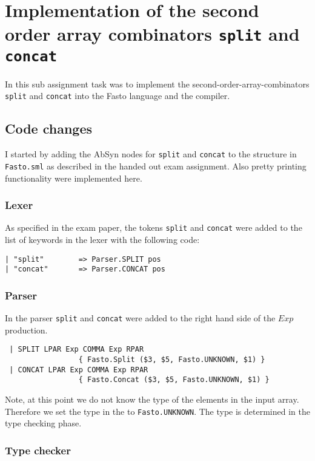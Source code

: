 \documentclass[11pt,a4paper]{article}
\begin{document}
\section{Implementation of the second order array combinators \texttt{split}
and \texttt{concat}}
In this sub assignment task was to implement the second-order-array-combinators \texttt{split}
and \texttt{concat} into the Fasto language and the compiler.

\subsection{Code changes}
I started by adding the AbSyn nodes for \texttt{split} and \texttt{concat}
to the structure in \texttt{Fasto.sml} as described in the handed out exam
assignment. Also pretty printing functionality were implemented here.

\subsubsection{Lexer}
As specified in the exam paper, the tokens \texttt{split} and \texttt{concat}
were added to the list of keywords in the lexer with the following code:
\begin{lstlisting}
| "split"        => Parser.SPLIT pos
| "concat"       => Parser.CONCAT pos
\end{lstlisting}

\subsubsection{Parser}
In the parser \texttt{split} and \texttt{concat} were added to the right hand
side of the $Exp$ production.
\begin{lstlisting}
 | SPLIT LPAR Exp COMMA Exp RPAR
                 { Fasto.Split ($3, $5, Fasto.UNKNOWN, $1) }
 | CONCAT LPAR Exp COMMA Exp RPAR
                 { Fasto.Concat ($3, $5, Fasto.UNKNOWN, $1) }
\end{lstlisting}
Note, at this point we do not know the type of the elements in the input
array. Therefore we set the type in the to \texttt{Fasto.UNKNOWN}.
The type is determined in the type checking phase.

\subsubsection{Type checker}
\end{document}
